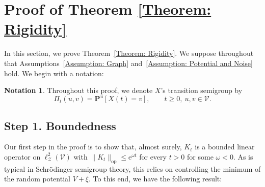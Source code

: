 \documentclass{amsart}
\numberwithin{equation}{section}
\theoremstyle{definition}
\newtheorem{notation}[theorem]{Notation}
\newcommand\om{\omega}
\newcommand\mbf{\mathbf}
\newcommand\mr{\mathrm}
\newcommand\ms{\mathscr}
\begin{document}
\section{Proof of Theorem \ref{Theorem: Rigidity}}
\label{Section: Rigidity}

% 

In this section, we prove Theorem~\ref{Theorem: Rigidity}.
We suppose throughout that Assumptions~\ref{Assumption: Graph} and~\ref{Assumption: Potential and Noise} hold.
We begin with a notation:

%

\begin{notation}
Throughout this proof,
we denote $X$'s transition semigroup by
\[\Pi_t(u,v)=\mbf P^u[X(t)=v],\qquad t\geq0,~u,v\in\ms V.\]
\end{notation}


%

\subsection{Step 1. Boundedness}
\label{Section: Boundedness}

%

Our first step in the proof is to show that, almost surely, $K_t$ is a bounded linear operator
on $\ell^2_\ms Z(\ms V)$ with $\|K_t\|_{\mr{op}}\leq\mr e^{\om t}$
for every $t>0$ for some $\om<0$. As is typical in Schr\"odinger semigroup theory,
this relies on controlling the minimum of the random potential $V+\xi$. To this end, we have the following
result:

%
\end{document}
